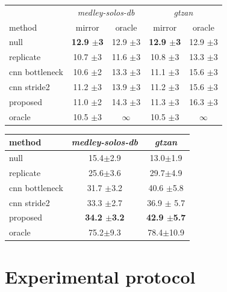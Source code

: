 \documentclass[a0,portrait,20pt]{a0poster}
\begin{document}
\begin{multicols}{2}
\begin{minipage}[c]{.55\linewidth}
  \begin{center}
\begin{tabular}{lcc|cc}
  & \multicolumn{2}{c|}{\textit{medley-solos-db}} & \multicolumn{2}{c}{\textit{gtzan}} \\
  method & mirror & oracle & mirror & oracle \\
\hline
null & \textbf{12.9 $\pm$3} & 12.9 $\pm$3 & \textbf{12.9 $\pm$3} &  12.9 $\pm$3\\
replicate & 10.7 $\pm$3 & 11.6 $\pm$3 & 10.8 $\pm$3 & 13.3 $\pm$3\\
\hline
cnn bottleneck & 10.6 $\pm$2 &  13.3 $\pm$3 & 11.1 $\pm$3 & 15.6 $\pm$3 \\
cnn stride2 & 11.2 $\pm$3 & 13.9 $\pm$3 & 11.2 $\pm$3 & 15.6 $\pm$3 \\
\hline
proposed  & 11.0 $\pm$2 & 14.3 $\pm$3  & 11.3 $\pm$3 & 16.3 $\pm$3 \\
\hline
oracle & 10.5 $\pm$3 & $\infty$ & 10.5 $\pm$3 & $\infty$ \\
\end{tabular}
\end{center}
\end{minipage}
\begin{minipage}[c]{.4\linewidth}
\begin{center}
\begin{tabular}{lcc}
method & \textit{medley-solos-db} & \textit{gtzan} \\
\hline
null & 15.4$\pm$2.9 & 13.0$\pm$1.9  \\
replicate & 25.6$\pm$3.6 & 29.7$\pm$4.9 \\
\hline
cnn bottleneck & 31.7 $\pm$3.2 & 40.6 $\pm$5.8 \\
cnn stride2 & 33.3 $\pm$2.7 & 36.9 $\pm$ 5.7 \\
\hline
proposed & \textbf{34.2 $\pm$3.2} & \textbf{42.9 $\pm$5.7} \\
\hline
oracle  & 75.2$\pm$9.3 & 78.4$\pm$10.9  \\
\end{tabular}
\end{center}
\end{minipage}


\section*{Experimental protocol}
\label{sec:protocol}


\end{multicols}
\end{document}
